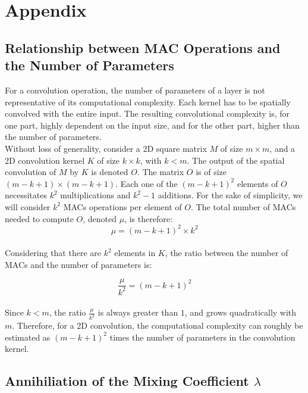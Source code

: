 \appendix

\chapter{Appendix}

\section{Relationship between \acl{MAC} Operations and the Number of Parameters}\label{sec:appendix:macs}

For a convolution operation, the number of parameters of a layer is not
representative of its computational complexity. Each kernel has to be spatially
convolved with the entire input. The resulting convolutional complexity is, for
one part, highly dependent on the input size, and for the other part, higher
than the number of parameters.\\

Without loss of generality, consider a 2D square matrix $M$ of size $m \times
m$, and a 2D convolution kernel $K$ of size $k \times k$, with $k<m$. The output
of the spatial convolution of $M$ by $K$ is denoted $O$. The matrix $O$ is of
size $(m-k+1) \times (m-k+1)$. Each one of the $(m-k+1)^2$ elements of $O$
necessitates $k^2$ multiplications and $k^2-1$ additions. For the sake of
simplicity, we will consider $k^2$ \acfp{MAC} operations per element of $O$. The
total number of \acp{MAC} needed to compute $O$, denoted $\mu$, is therefore:\\
$$
\mu = (m-k+1)^2 \times k^2
$$\\

Considering that there are $k^2$ elements in $K$, the ratio between the number
of \acp{MAC} and the number of parameters is:

$$
\frac{\mu}{k^2} = (m-k+1)^2
$$\\


Since $k<m$, the ratio $\frac{\mu}{k^2}$ is always greater than $1$, and grows
quadratically with $m$. Therefore, for a 2D convolution, the computational
complexity can roughly be estimated as $(m-k+1)^2$ times the number of
parameters in the convolution kernel.\\

\section{Annihiliation of the Mixing Coefficient \texorpdfstring{$\lambda$}{lambda}}
\label{sec:appendix:annihilation}


